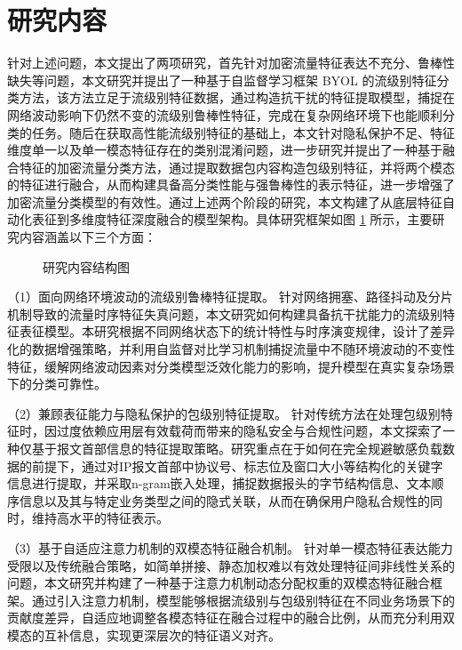 \section{研究内容}
针对上述问题，本文提出了两项研究，首先针对加密流量特征表达不充分、鲁棒性缺失等问题，本文研究并提出了一种基于自监督学习框架 BYOL 的流级别特征分类方法，该方法立足于流级别特征数据，通过构造抗干扰的特征提取模型，捕捉在网络波动影响下仍然不变的流级别鲁棒性特征，完成在复杂网络环境下也能顺利分类的任务。随后在获取高性能流级别特征的基础上，本文针对隐私保护不足、特征维度单一以及单一模态特征存在的类别混淆问题，进一步研究并提出了一种基于融合特征的加密流量分类方法，通过提取数据包内容构造包级别特征，并将两个模态的特征进行融合，从而构建具备高分类性能与强鲁棒性的表示特征，进一步增强了加密流量分类模型的有效性。通过上述两个阶段的研究，本文构建了从底层特征自动化表征到多维度特征深度融合的模型架构。具体研究框架如图 \ref{fig:content} 所示，主要研究内容涵盖以下三个方面：

\begin{figure}[ht]
  \centering
  \caption{研究内容结构图}
  \label{fig:content}
\end{figure}

（1）面向网络环境波动的流级别鲁棒特征提取。
针对网络拥塞、路径抖动及分片机制导致的流量时序特征失真问题，本文研究如何构建具备抗干扰能力的流级别特征表征模型。本研究根据不同网络状态下的统计特性与时序演变规律，设计了差异化的数据增强策略，并利用自监督对比学习机制捕捉流量中不随环境波动的不变性特征，缓解网络波动因素对分类模型泛效化能力的影响，提升模型在真实复杂场景下的分类可靠性。

（2）兼顾表征能力与隐私保护的包级别特征提取。
针对传统方法在处理包级别特征时，因过度依赖应用层有效载荷而带来的隐私安全与合规性问题，本文探索了一种仅基于报文首部信息的特征提取策略。研究重点在于如何在完全规避敏感负载数据的前提下，通过对IP报文首部中协议号、标志位及窗口大小等结构化的关键字信息进行提取，并采取n-gram嵌入处理，捕捉数据报头的字节结构信息、文本顺序信息以及其与特定业务类型之间的隐式关联，从而在确保用户隐私合规性的同时，维持高水平的特征表示。

（3）基于自适应注意力机制的双模态特征融合机制。
针对单一模态特征表达能力受限以及传统融合策略，如简单拼接、静态加权难以有效处理特征间非线性关系的问题，本文研究并构建了一种基于注意力机制动态分配权重的双模态特征融合框架。通过引入注意力机制，模型能够根据流级别与包级别特征在不同业务场景下的贡献度差异，自适应地调整各模态特征在融合过程中的融合比例，从而充分利用双模态的互补信息，实现更深层次的特征语义对齐。

